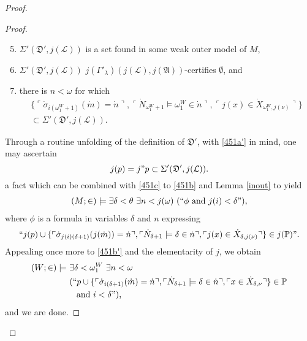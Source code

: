 \documentclass[12pt]{article}
\numberwithin{equation}{section}
\begin{document}
\begin{proof}
\begin{proof}
\begin{enumerate}[label=(\alph*)]
    \setcounter{enumi}{4}
    \item\label{451c} $\Sigma'(\mathfrak{D}', j(\mathcal{L}))$ is a set found in some weak outer model of $M$,
    \item\label{451a} $\Sigma'(\mathfrak{D}', j(\mathcal{L}))$ $j(\Gamma'_{\lambda}) (j(\mathcal{L}), j(\mathfrak{A}))$-certifies $\emptyset$, and
    \item\label{451b} there is $n < \omega$ for which 
    \begin{gather*}
        \{\ulcorner \dot{\sigma}_{i(\omega_1^W + 1)}(\dot{m}) = \dot{n} \urcorner, \ulcorner \dot{N}_{\omega_1^W + 1} \models \omega_1^W \in \dot{n} \urcorner, \ulcorner j(x) \in \dot{X}_{\omega_1^W, j(\nu)} \urcorner\} \\
        \subset \Sigma'(\mathfrak{D}', j(\mathcal{L})) \text{.}
    \end{gather*}
\end{enumerate}
Through a routine unfolding of the definition of $\mathfrak{D}'$, with \ref{451a'} in mind, one may ascertain 
\begin{equation*}
    j(p) = j" p \subset \Sigma'(\mathfrak{D}', j(\mathcal{L})) \text{.}
\end{equation*}
a fact which can be combined with \ref{451c} to \ref{451b} and Lemma \ref{inout} to yield
\begin{align*}
    (M; \in) \models \exists \delta < \theta \ \exists n < j(\omega) \ (``\phi \text{ and } j(i) < \delta") \text{,}
\end{align*}
where $\phi$ is a formula in variables $\delta$ and $n$ expressing
\begin{equation*}
    ``j(p) \cup \{\ulcorner \dot{\sigma}_{j(i)(\delta + 1)}(j(\dot{m})) = \dot{n} \urcorner, \ulcorner \dot{N}_{\delta + 1} \models \delta \in \dot{n} \urcorner, \ulcorner j(x) \in \dot{X}_{\delta, j(\nu)} \urcorner\} \in j(\mathbb{P})" \text{.}
\end{equation*}
Appealing once more to \ref{451b'} and the elementarity of $j$, we obtain
\begin{align*}
    (W; \in) \models \ & \exists \delta < \omega_1^W \ \exists n < \omega \\
    & (``p \cup \{\ulcorner \dot{\sigma}_{i(\delta + 1)}(\dot{m}) = \dot{n} \urcorner, \ulcorner \dot{N}_{\delta + 1} \models \delta \in \dot{n} \urcorner, \ulcorner x \in \dot{X}_{\delta, \nu} \urcorner\} \in \mathbb{P} \\
    & \mspace{15mu} \text{and } i < \delta") \text{,}
\end{align*}
and we are done.
\end{proof}


\end{proof}
\end{document}
